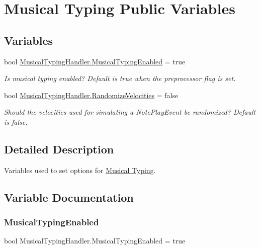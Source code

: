 \hypertarget{group___mus_typ_pub_var}{}\section{Musical Typing Public Variables}
\label{group___mus_typ_pub_var}
\subsection*{Variables}
\begin{DoxyCompactItemize}
\item 
bool \hyperlink{group___mus_typ_pub_var_ga09a764161d537b31fac1a64ee5d39625}{Musical\+Typing\+Handler.\+Musical\+Typing\+Enabled} = true
\begin{DoxyCompactList}\small\item\em Is musical typing enabled? Default is true when the preprocessor flag is set. \end{DoxyCompactList}\item 
bool \hyperlink{group___mus_typ_pub_var_gad09f6f673034d9cd95f699838c9518d5}{Musical\+Typing\+Handler.\+Randomize\+Velocities} = false
\begin{DoxyCompactList}\small\item\em Should the velocities used for simulating a Note\+Play\+Event be randomized? Default is false. \end{DoxyCompactList}\end{DoxyCompactItemize}


\subsection{Detailed Description}
Variables used to set options for \hyperlink{group___mus_typ}{Musical Typing}. 

\subsection{Variable Documentation}
\mbox{\label{group___mus_typ_pub_var_ga09a764161d537b31fac1a64ee5d39625}} 
\subsubsection{\texorpdfstring{Musical\+Typing\+Enabled}{MusicalTypingEnabled}}
{\footnotesize\ttfamily bool Musical\+Typing\+Handler.\+Musical\+Typing\+Enabled = true}



